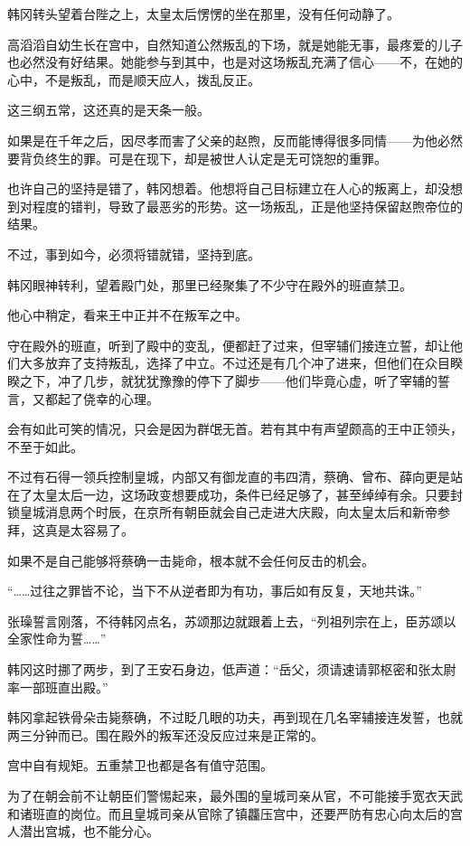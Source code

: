 韩冈转头望着台陛之上，太皇太后愣愣的坐在那里，没有任何动静了。

高滔滔自幼生长在宫中，自然知道公然叛乱的下场，就是她能无事，最疼爱的儿子也必然没有好结果。她能参与到其中，也是对这场叛乱充满了信心——不，在她的心中，不是叛乱，而是顺天应人，拨乱反正。

这三纲五常，这还真的是天条一般。

如果是在千年之后，因尽孝而害了父亲的赵煦，反而能博得很多同情——为他必然要背负终生的罪。可是在现下，却是被世人认定是无可饶恕的重罪。

也许自己的坚持是错了，韩冈想着。他想将自己目标建立在人心的叛离上，却没想到对程度的错判，导致了最恶劣的形势。这一场叛乱，正是他坚持保留赵煦帝位的结果。

不过，事到如今，必须将错就错，坚持到底。

韩冈眼神转利，望着殿门处，那里已经聚集了不少守在殿外的班直禁卫。

他心中稍定，看来王中正并不在叛军之中。

守在殿外的班直，听到了殿中的变乱，便都赶了过来，但宰辅们接连立誓，却让他们大多放弃了支持叛乱，选择了中立。不过还是有几个冲了进来，但他们在众目睽睽之下，冲了几步，就犹犹豫豫的停下了脚步——他们毕竟心虚，听了宰辅的誓言，又都起了侥幸的心理。

会有如此可笑的情况，只会是因为群氓无首。若有其中有声望颇高的王中正领头，不至于如此。

不过有石得一领兵控制皇城，内部又有御龙直的韦四清，蔡确、曾布、薛向更是站在了太皇太后一边，这场政变想要成功，条件已经足够了，甚至绰绰有余。只要封锁皇城消息两个时辰，在京所有朝臣就会自己走进大庆殿，向太皇太后和新帝参拜，这真是太容易了。

如果不是自己能够将蔡确一击毙命，根本就不会任何反击的机会。

“……过往之罪皆不论，当下不从逆者即为有功，事后如有反复，天地共诛。”

张璪誓言刚落，不待韩冈点名，苏颂那边就跟着上去，“列祖列宗在上，臣苏颂以全家性命为誓……”

韩冈这时挪了两步，到了王安石身边，低声道：“岳父，须请速请郭枢密和张太尉率一部班直出殿。”

韩冈拿起铁骨朵击毙蔡确，不过眨几眼的功夫，再到现在几名宰辅接连发誓，也就两三分钟而已。围在殿外的叛军还没反应过来是正常的。

宫中自有规矩。五重禁卫也都是各有值守范围。

为了在朝会前不让朝臣们警惕起来，最外围的皇城司亲从官，不可能接手宽衣天武和诸班直的岗位。而且皇城司亲从官除了镇龘压宫中，还要严防有忠心向太后的宫人潜出宫城，也不能分心。

